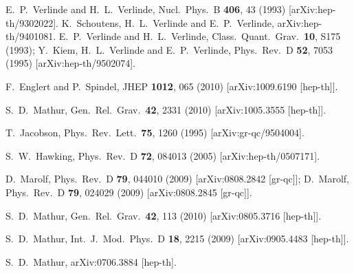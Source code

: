 \documentclass[11pt]{article}
\begin{document}
\begin{thebibliography}{10}
E.~P.~Verlinde and H.~L.~Verlinde,
  Nucl.\ Phys.\  B {\bf 406}, 43 (1993)
  [arXiv:hep-th/9302022].
K.~Schoutens, H.~L.~Verlinde and E.~P.~Verlinde,
  arXiv:hep-th/9401081.
  E.~P.~Verlinde and H.~L.~Verlinde,
  Class.\ Quant.\ Grav.\  {\bf 10}, S175 (1993);
Y.~Kiem, H.~L.~Verlinde and E.~P.~Verlinde,
  Phys.\ Rev.\  D {\bf 52}, 7053 (1995)
  [arXiv:hep-th/9502074].

        F.~Englert and P.~Spindel,
        JHEP {\bf 1012}, 065 (2010)
        [arXiv:1009.6190 [hep-th]].

  S.~D.~Mathur,
  Gen.\ Rel.\ Grav.\  {\bf 42}, 2331 (2010)
  [arXiv:1005.3555 [hep-th]].

  T.~Jacobson,
  Phys.\ Rev.\ Lett.\  {\bf 75}, 1260 (1995)
  [arXiv:gr-qc/9504004].



  S.~W.~Hawking,
  Phys.\ Rev.\  D {\bf 72}, 084013 (2005)
  [arXiv:hep-th/0507171].

D.~Marolf,
  Phys.\ Rev.\  D {\bf 79}, 044010 (2009)
  [arXiv:0808.2842 [gr-qc]];
 D.~Marolf,
  Phys.\ Rev.\  D {\bf 79}, 024029 (2009)
  [arXiv:0808.2845 [gr-qc]].

  S.~D.~Mathur,
  Gen.\ Rel.\ Grav.\  {\bf 42}, 113 (2010)
  [arXiv:0805.3716 [hep-th]].


  S.~D.~Mathur,
  Int.\ J.\ Mod.\ Phys.\  D {\bf 18}, 2215 (2009)
  [arXiv:0905.4483 [hep-th]].

  S.~D.~Mathur,
  arXiv:0706.3884 [hep-th].




  
\end{thebibliography}
\end{document}
